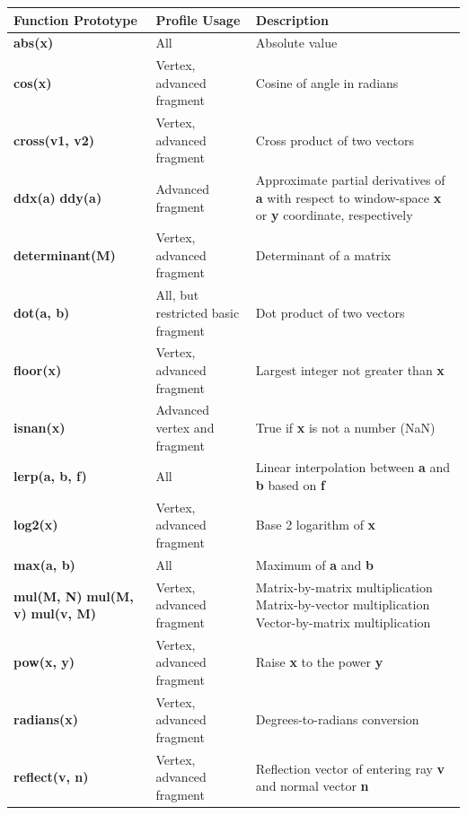 \documentclass{book}
\begin{document}
\begin{table}
\centering
\begin{tabular}{ p{3cm} p{3cm} p{5cm}  } 

Function Prototype & Profile Usage & Description \\
\hline

\textbf{abs(x)} & All & Absolute value \\
\hline
\textbf{cos(x)} & Vertex, advanced fragment & Cosine of angle in radians \\
\hline
\textbf{cross(v1, v2)} & Vertex, advanced fragment & Cross product of two vectors \\
\hline
\textbf{ddx(a)} \newline \textbf{ddy(a)} & Advanced fragment & Approximate partial derivatives of \textbf{a} with respect to window-space \textbf{x} or \textbf{y} coordinate, respectively \\
\hline
\textbf{determinant(M)} & Vertex, advanced fragment & Determinant of a matrix \\
\hline
\textbf{dot(a, b)} & All, but restricted basic fragment & Dot product of two vectors \\
\hline
\textbf{floor(x)} & Vertex, advanced fragment & Largest integer not greater than \textbf{x} \\
\hline
\textbf{isnan(x)} & Advanced vertex and fragment & True if \textbf{x} is not a number (NaN) \\
\hline
\textbf{lerp(a, b, f)} & All & Linear interpolation between \textbf{a} and \textbf{b} based on \textbf{f} \\
\hline
\textbf{log2(x)} & Vertex, advanced fragment & Base 2 logarithm of \textbf{x} \\
\hline
\textbf{max(a, b)} & All & Maximum of \textbf{a} and \textbf{b} \\
\hline
\textbf{mul(M, N)} \newline \textbf{mul(M, v)} \newline \textbf{mul(v, M)} & Vertex, advanced fragment & 
Matrix-by-matrix multiplication \newline Matrix-by-vector multiplication \newline Vector-by-matrix multiplication \\
\hline
\textbf{pow(x, y)} & Vertex, advanced fragment & Raise \textbf{x} to the power \textbf{y} \\
\hline
\textbf{radians(x)} & Vertex, advanced fragment & Degrees-to-radians conversion \\
\hline
\textbf{reflect(v, n)} & Vertex, advanced fragment & Reflection vector of entering ray \textbf{v} and normal vector \textbf{n} \\

\end{tabular}
\end{table}
\end{document}
